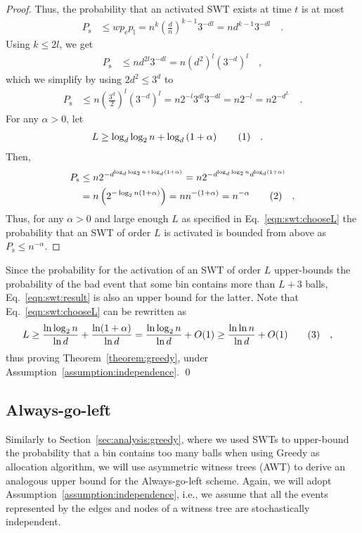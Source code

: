 \documentclass[a4paper,12pt]{article}
\newcommand\numberthis{\addtocounter{equation}{1}\tag{\theequation}}
\newcommand\neqn[1]{\numberthis\label{eqn:#1}}
\begin{document}
\begin{proof}
Thus, the probability that an activated SWT exists at time $t$ is at most 
\begin{align*}
P_\mathrm{s} &\leq w  p_\mathrm{e}  p_\mathrm{l} 
		= n^{k}  \left(\frac{d}{n}\right)^{k-1}  3^{-d  l} 
		= n  d^{k-1}  3^{-d  l}\quad .
\end{align*}
Using $k \leq 2l$, we get
\begin{align*}
P_\mathrm{s} &\leq n  d^{2 l}  3^{-d  l} 
		= n  \left(d^2\right)^l  \left( 3^{-d} \right)^l\quad ,
\end{align*}
which we simplify by using $2d^2 \leq 3^d$ to
\begin{align*}
P_\mathrm{s} &\leq n  \left(\frac{3^d}{2}\right)^l  \left( 3^{-d}\right)^l 
		= n  2^{-l}  3^{d l}  3^{-d  l} 
		= n 2^{-l}		
		= n 2^{-d^L} \quad .		
\end{align*}
For any $\alpha > 0 $, let
\begin{align*}
L &\geq \log_d\log_2 n + \log_d\left(1+\alpha\right) \neqn{swt:chooseL} \quad .
\end{align*}
Then, 
\begin{align*}
P_\mathrm{s} &\leq n  2^{{-d}^{\log_d\log_2 n + \log_d\left(1+\alpha\right)}} 
		= n  2^{-{d}^{\log_d\log_2 n} d^{\log_d \left(1+\alpha\right)}} \\
		&= n  \left( 2^{-\log_2 n  \left(1+ \alpha \right)} \right) 
		= n  n^{-\left(1+\alpha\right)} = n^{-\alpha} \neqn{swt:result}\quad .
\end{align*}
Thus, for any $\alpha>0$ and large enough $L$ as specified in Eq.~\ref{eqn:swt:chooseL} the probability that an SWT of order $L$ is activated is bounded from above as $P_\mathrm{s}\leq n^{-\alpha}$.
\end{proof}

Since the probability for the activation of an SWT of order $L$ upper-bounds the probability of the bad event that some bin contains more than $L+3$ balls, Eq.~\ref{eqn:swt:result} is also an upper bound for the latter. Note that Eq.~\ref{eqn:swt:chooseL} can be rewritten as
\begin{align*}
L &\geq  \frac{\ln\log_2 n}{\ln d} + \frac{\ln(1+\alpha)}{\ln d} 
   = \frac{\ln \log_2 n}{\ln d} +O(1) 
  \geq \frac{\ln \ln n}{\ln d} +O(1) \neqn{swt:boundL} \quad ,
\end{align*}
thus proving Theorem~\ref{theorem:greedy}, under Assumption~\ref{assumption:independence}. \qed

\subsection{Always-go-left}
\label{sec:analysis:alg}
Similarly to Section~\ref{sec:analysis:greedy}, where we used SWTs to upper-bound the probability that a bin contains too many balls when using Greedy as allocation algorithm, we will use asymmetric witness trees (AWT) to derive an analogous upper bound for the Always-go-left scheme. Again, we will adopt Assumption~\ref{assumption:independence}, i.e., we assume that all the events represented by the edges and nodes of a witness tree are stochastically independent.
\end{document}
